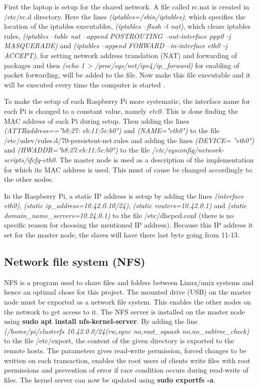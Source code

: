 \documentclass[../Head/Report.tex]{subfiles}
\begin{document}
First the laptop is setup for the shared network. A file called rc.nat is created in /etc/rc.d directory. Here the lines \textit{(iptables=/sbin/iptables)}, which specifies the location of the iptables executables, \textit{(iptables --flush -t nat)}, which clears iptables rules, \textit{(iptables --table nat --append POSTROUTING --out-interface ppp0 -j MASQUERADE)} and \textit{(iptables --append FORWARD --in-interface eth0 -j ACCEPT)}, for setting network address translation (NAT) and forwarding of packages and then \textit{(echo 1 > /proc/sys/net/ipv4/ip\_forward)} for enabling of packet forwarding, will be added to the file. Now make this file executable and it will be executed every time the computer is started \cite{Networking}.

To make the setup of each Raspberry Pi more systematic, the interface name for each Pi is changed to a constant value, namely \textit{etc0}. This is done finding the MAC address of each Pi during setup. Then adding the lines \textit{(ATTR{address}=="b8:27:} \textit{eb:11:5e:b0")} and \textit{(NAME="eth0")} to the file /etc/udev/rules.d/70-persistent-net.rules and adding the lines \textit{(DEVICE=} \textit{"eth0")} and \textit{(HWADDR="b8:27:eb:11:5e:b0")} to the file  \textit{/etc/sysconfig/network-scripts/ifcfg-eth0}. The master node is used as a description of the implementation for which its MAC address is used. This must of cause be changed accordingly to the other nodes.\cite{Interface_Name}     

In the Raspberry Pi, a static IP address is setup by adding the lines \textit{(interface eth0)}, \textit{(static ip\_address=10.42.0.10/24)}, \textit{(static routers=10.42.0.1)} and \textit{(static domain\_name\_servers=10.24.0.1)} to the file /etc/dhcpcd.conf (there is no specific reason for choosing the mentioned IP address). Because this IP address it set for the master node, the slaves will have there last byte going from 11-13.

\subsection{Network file system (NFS)} 

NFS is a program used to share files and folders between Linux/unix systems and hence an optimal chose for this project. The mounted drive (USB) on the master node must be exported as a network file system. This enables the other nodes on the network to get access to it. The NFS server is installed on the master node using \textbf{sudo apt install nfs-kernel-server}. By adding the line \textit{(/home/pi/clusterfs 10.42.0.0/24(rw,sync no,root\_squash no,no\_subtree\_check)} to the file /etc/export, the content of the given directory is exported to the remote hosts. The parameters gives read-write permission, forced changes to be written on each transaction, enables the root users of clients write files with root permissions and prevention of error if race condition occurs during read-write of files. The kernel server can now be updated using \textbf{sudo exportfs -a}. 
\end{document}

